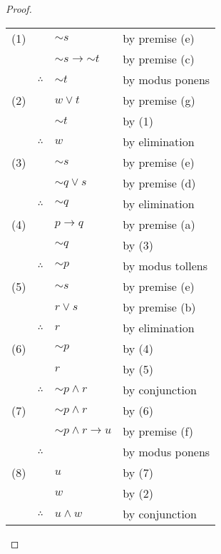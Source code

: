 \documentclass[14pt]{extarticle}
\begin{document}
\begin{proof}
\begin{tabular}{rrll}
(1) & & ${\sim s}$ & by premise (e) \\
 & & ${\sim s} \to {\sim t}$ & by premise (c) \\
 & $\therefore$ & ${\sim t}$ & by modus ponens \\
(2) & & $w \vee t$ & by premise (g) \\
 & & ${\sim t}$ & by (1) \\
 & $\therefore$ & $w$ & by elimination \\
(3) & & ${\sim s}$ & by premise (e) \\
 & & ${\sim q} \vee s$ & by premise (d) \\
 & $\therefore$ & ${\sim q}$ & by elimination \\
(4) & & $p \to q$ & by premise (a) \\
 & & ${\sim q}$ & by (3) \\
 & $\therefore$ & ${\sim p}$ & by modus tollens \\
(5) & & ${\sim s}$ & by premise (e) \\
 & & $r \vee s$ & by premise (b) \\
 & $\therefore$ & $r$ & by elimination \\
(6) & & ${\sim p}$ & by (4) \\
 & & $r$ & by (5) \\
 & $\therefore$ & ${\sim p} \wedge r$ & by conjunction \\
(7) & & ${\sim p} \wedge r$ & by (6) \\
 & & ${\sim p} \wedge r \to u$ & by premise (f) \\
 & $\therefore$ & $ $ & by modus ponens \\
(8) & & $u$ & by (7) \\
 & & $w$ & by (2) \\
 & $\therefore$ & $u \wedge w$ & by conjunction \\
\end{tabular}
\end{proof}
\end{document}
